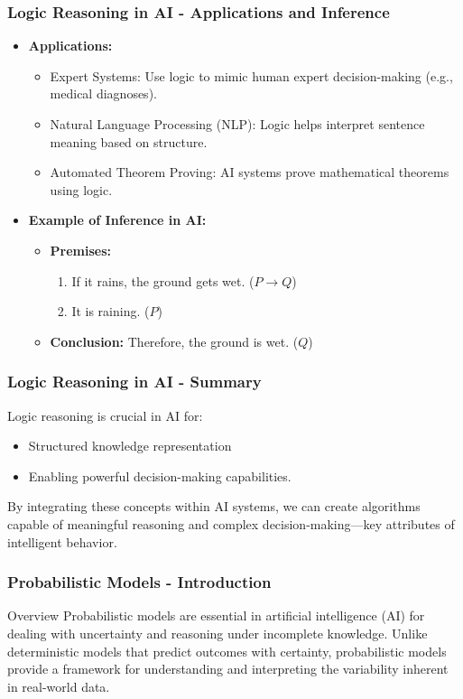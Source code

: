 \documentclass[aspectratio=169]{beamer}
\begin{document}
\begin{frame}[fragile]
    \frametitle{Logic Reasoning in AI - Applications and Inference}
    \begin{itemize}
        \item \textbf{Applications:}
        \begin{itemize}
            \item Expert Systems: Use logic to mimic human expert decision-making (e.g., medical diagnoses).
            \item Natural Language Processing (NLP): Logic helps interpret sentence meaning based on structure.
            \item Automated Theorem Proving: AI systems prove mathematical theorems using logic.
        \end{itemize}
        
        \item \textbf{Example of Inference in AI:}
        \begin{itemize}
            \item \textbf{Premises:}
            \begin{enumerate}
                \item If it rains, the ground gets wet. ($P \rightarrow Q$)
                \item It is raining. ($P$)
            \end{enumerate}
            
            \item \textbf{Conclusion:} Therefore, the ground is wet. ($Q$)
        \end{itemize}
    \end{itemize}
\end{frame}

\begin{frame}[fragile]
    \frametitle{Logic Reasoning in AI - Summary}
    Logic reasoning is crucial in AI for:
    \begin{itemize}
        \item Structured knowledge representation
        \item Enabling powerful decision-making capabilities.
    \end{itemize}
    By integrating these concepts within AI systems, we can create algorithms capable of meaningful reasoning and complex decision-making—key attributes of intelligent behavior.
\end{frame}

\begin{frame}[fragile]
    \frametitle{Probabilistic Models - Introduction}
    \begin{block}{Overview}
        Probabilistic models are essential in artificial intelligence (AI) for dealing with uncertainty and reasoning under incomplete knowledge. Unlike deterministic models that predict outcomes with certainty, probabilistic models provide a framework for understanding and interpreting the variability inherent in real-world data.
    \end{block}
\end{frame}
\end{document}
